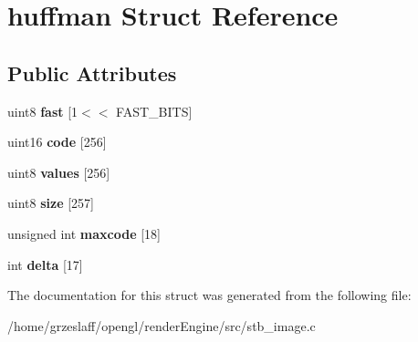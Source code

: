 \hypertarget{structhuffman}{\section{huffman Struct Reference}
\label{structhuffman}
}
\subsection*{Public Attributes}
\begin{DoxyCompactItemize}
\item 
\hypertarget{structhuffman_a9dbb29a8ed724a32f502d9595510ddc2}{uint8 {\bfseries fast} \mbox{[}1$<$$<$ F\-A\-S\-T\-\_\-\-B\-I\-T\-S\mbox{]}}\label{structhuffman_a9dbb29a8ed724a32f502d9595510ddc2}

\item 
\hypertarget{structhuffman_a9925018a95d5a2122cd732561fa0fa64}{uint16 {\bfseries code} \mbox{[}256\mbox{]}}\label{structhuffman_a9925018a95d5a2122cd732561fa0fa64}

\item 
\hypertarget{structhuffman_a313d78cf23f40b314c25681ff2a6224b}{uint8 {\bfseries values} \mbox{[}256\mbox{]}}\label{structhuffman_a313d78cf23f40b314c25681ff2a6224b}

\item 
\hypertarget{structhuffman_afdb0fbcf25aec42ba30b0d0e2453a057}{uint8 {\bfseries size} \mbox{[}257\mbox{]}}\label{structhuffman_afdb0fbcf25aec42ba30b0d0e2453a057}

\item 
\hypertarget{structhuffman_aeb78aca6c7377faaad8123566d54fc98}{unsigned int {\bfseries maxcode} \mbox{[}18\mbox{]}}\label{structhuffman_aeb78aca6c7377faaad8123566d54fc98}

\item 
\hypertarget{structhuffman_a04255e3e1c6de74d36a08a1aa4e9537d}{int {\bfseries delta} \mbox{[}17\mbox{]}}\label{structhuffman_a04255e3e1c6de74d36a08a1aa4e9537d}

\end{DoxyCompactItemize}


The documentation for this struct was generated from the following file\-:\begin{DoxyCompactItemize}
\item 
/home/grzeslaff/opengl/render\-Engine/src/stb\-\_\-image.\-c\end{DoxyCompactItemize}
